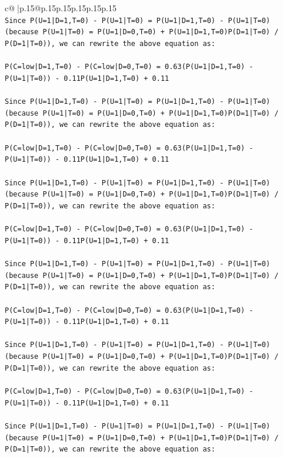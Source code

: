 \documentclass{article}
\begin{document}
{\begin{supertabular}{c@{$\;$}|p{.15\linewidth}@{}p{.15\linewidth}p{.15\linewidth}p{.15\linewidth}p{.15\linewidth}p{.15\linewidth}}
{{{\\ 
\texttt{Since P(U=1|D=1,T=0) {-} P(U=1|T=0) = P(U=1|D=1,T=0) {-} P(U=1|T=0) (because P(U=1|T=0) = P(U=1|D=0,T=0) + P(U=1|D=1,T=0)P(D=1|T=0) / P(D=1|T=0)), we can rewrite the above equation as:} \\
\\ 
\texttt{P(C=low|D=1,T=0) {-} P(C=low|D=0,T=0) = 0.63(P(U=1|D=1,T=0) {-} P(U=1|T=0)) {-} 0.11P(U=1|D=1,T=0) + 0.11} \\
\\ 
\texttt{Since P(U=1|D=1,T=0) {-} P(U=1|T=0) = P(U=1|D=1,T=0) {-} P(U=1|T=0) (because P(U=1|T=0) = P(U=1|D=0,T=0) + P(U=1|D=1,T=0)P(D=1|T=0) / P(D=1|T=0)), we can rewrite the above equation as:} \\
\\ 
\texttt{P(C=low|D=1,T=0) {-} P(C=low|D=0,T=0) = 0.63(P(U=1|D=1,T=0) {-} P(U=1|T=0)) {-} 0.11P(U=1|D=1,T=0) + 0.11} \\
\\ 
\texttt{Since P(U=1|D=1,T=0) {-} P(U=1|T=0) = P(U=1|D=1,T=0) {-} P(U=1|T=0) (because P(U=1|T=0) = P(U=1|D=0,T=0) + P(U=1|D=1,T=0)P(D=1|T=0) / P(D=1|T=0)), we can rewrite the above equation as:} \\
\\ 
\texttt{P(C=low|D=1,T=0) {-} P(C=low|D=0,T=0) = 0.63(P(U=1|D=1,T=0) {-} P(U=1|T=0)) {-} 0.11P(U=1|D=1,T=0) + 0.11} \\
\\ 
\texttt{Since P(U=1|D=1,T=0) {-} P(U=1|T=0) = P(U=1|D=1,T=0) {-} P(U=1|T=0) (because P(U=1|T=0) = P(U=1|D=0,T=0) + P(U=1|D=1,T=0)P(D=1|T=0) / P(D=1|T=0)), we can rewrite the above equation as:} \\
\\ 
\texttt{P(C=low|D=1,T=0) {-} P(C=low|D=0,T=0) = 0.63(P(U=1|D=1,T=0) {-} P(U=1|T=0)) {-} 0.11P(U=1|D=1,T=0) + 0.11} \\
\\ 
\texttt{Since P(U=1|D=1,T=0) {-} P(U=1|T=0) = P(U=1|D=1,T=0) {-} P(U=1|T=0) (because P(U=1|T=0) = P(U=1|D=0,T=0) + P(U=1|D=1,T=0)P(D=1|T=0) / P(D=1|T=0)), we can rewrite the above equation as:} \\
\\ 
\texttt{P(C=low|D=1,T=0) {-} P(C=low|D=0,T=0) = 0.63(P(U=1|D=1,T=0) {-} P(U=1|T=0)) {-} 0.11P(U=1|D=1,T=0) + 0.11} \\
\\ 
\texttt{Since P(U=1|D=1,T=0) {-} P(U=1|T=0) = P(U=1|D=1,T=0) {-} P(U=1|T=0) (because P(U=1|T=0) = P(U=1|D=0,T=0) + P(U=1|D=1,T=0)P(D=1|T=0) / P(D=1|T=0)), we can rewrite the above equation as:} \\
}}}
\end{supertabular}}
\end{document}
